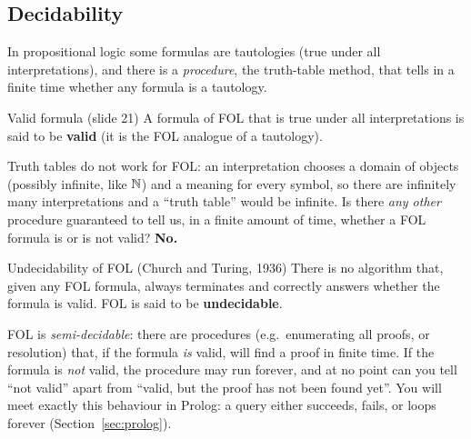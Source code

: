 \subsection{Decidability}
\label{sec:decidability}

In propositional logic some formulas are tautologies (true under all interpretations), and
there is a \emph{procedure}, the truth-table method, that tells in a finite time whether any
formula is a tautology.

\begin{nbdef}{Valid formula (slide 21)}
A formula of FOL that is true under all interpretations is said to be \textbf{valid}
(it is the FOL analogue of a tautology).
\end{nbdef}

Truth tables do not work for FOL: an interpretation chooses a domain of objects (possibly
infinite, like $\mathbb{N}$) and a meaning for every symbol, so there are infinitely many
interpretations and a ``truth table'' would be infinite. Is there \emph{any other}
procedure guaranteed to tell us, in a finite amount of time, whether a FOL formula is or
is not valid? \textbf{No.}

\begin{nbfact}{Undecidability of FOL (Church and Turing, 1936)}
There is no algorithm that, given any FOL formula, always terminates and correctly answers
whether the formula is valid. FOL is said to be \textbf{undecidable}.
\end{nbfact}

\begin{nbintuition}
\notinslides
FOL is \emph{semi-decidable}: there are procedures (e.g.\ enumerating all proofs, or
resolution) that, if the formula \emph{is} valid, will find a proof in finite time. If the
formula is \emph{not} valid, the procedure may run forever, and at no point can you tell
``not valid'' apart from ``valid, but the proof has not been found yet''. You will meet
exactly this behaviour in Prolog: a query either succeeds, fails, or loops forever
(Section~\ref{sec:prolog}).
\end{nbintuition}

\begin{center}
\end{center}

